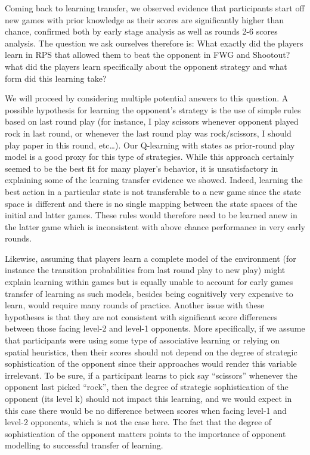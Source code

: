 \documentclass[man,floatsintext]{apa6}
\begin{document}
Coming back to learning transfer, we observed evidence that participants start off new games with prior knowledge as their scores are significantly higher than chance, confirmed both by early stage analysis as well as rounds 2-6 scores analysis. The question we ask ourselves therefore is: What exactly did the players learn in RPS that allowed them to beat the opponent in FWG and Shootout? what did the players learn specifically about the opponent strategy and what form did this learning take?

We will proceed by considering multiple potential answers to this question. A possible hypothesis for learning the opponent's strategy is the use of simple rules based on last round play (for instance, I play scissors whenever opponent played rock in last round, or whenever the last round play was rock/scissors, I should play paper in this round, etc\ldots{}). Our Q-learning with states as prior-round play model is a good proxy for this type of strategies. While this approach certainly seemed to be the best fit for many player's behavior, it is unsatisfactory in explaining some of the learning transfer evidence we showed. Indeed, learning the best action in a particular state is not transferable to a new game since the state space is different and there is no single mapping between the state spaces of the initial and latter games. These rules would therefore need to be learned anew in the latter game which is inconsistent with above chance performance in very early rounds.

Likewise, assuming that players learn a complete model of the environment (for instance the transition probabilities from last round play to new play) might explain learning within games but is equally unable to account for early games transfer of learning as such models, besides being cognitively very expensive to learn, would require many rounds of practice. Another issue with these hypotheses is that they are not consistent with significant score differences between those facing level-2 and level-1 opponents. More specifically, if we assume that participants were using some type of associative learning or relying on spatial heuristics, then their scores should not depend on the degree of strategic sophistication of the opponent since their approaches would render this variable irrelevant. To be sure, if a participant learns to pick say \enquote{scissors} whenever the opponent last picked \enquote{rock}, then the degree of strategic sophistication of the opponent (its level k) should not impact this learning, and we would expect in this case there would be no difference between scores when facing level-1 and level-2 opponents, which is not the case here. The fact that the degree of sophistication of the opponent matters points to the importance of opponent modelling to successful transfer of learning.
\end{document}
